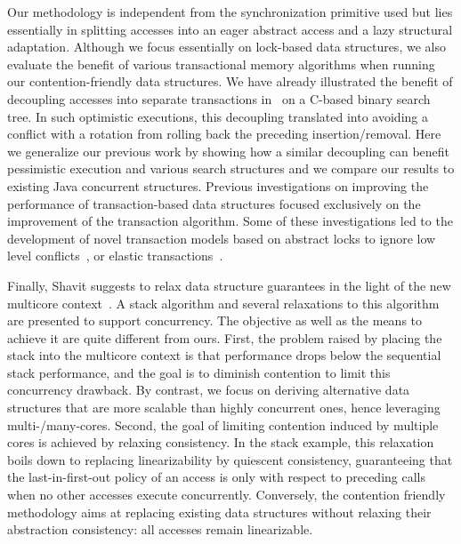 Our methodology is independent from the synchronization primitive used but lies essentially in splitting 
accesses into an eager abstract access and a lazy structural adaptation.
Although we focus essentially on lock-based data structures, we also evaluate the benefit of various
transactional memory algorithms when running our contention-friendly data structures.
We have already illustrated the benefit of decoupling accesses into separate transactions 
in~\cite{CGR12} on a C-based 
binary search tree.  In such optimistic executions, this decoupling translated into avoiding a conflict with a 
rotation from rolling back the preceding insertion/removal.
Here we generalize our previous work by showing how a similar decoupling can benefit 
pessimistic execution and various search structures and we compare our results to existing Java concurrent structures.
Previous investigations on improving the performance of transaction-based data structures focused 
exclusively on the improvement of the transaction algorithm. Some of these investigations led to the 
development of novel transaction models based on abstract locks to ignore low level conflicts~\cite{NMA+07,HK08}, 
or elastic transactions~\cite{FGG09}.

Finally, Shavit suggests to relax data structure guarantees in the light of the new multicore context~\cite{Sha11}. A stack algorithm and several relaxations to this algorithm
are presented to support concurrency. The objective as well as the means to achieve it are quite different from ours. 
First, the problem raised by placing the stack into the multicore context is that performance drops below the sequential stack performance, and 
the goal is to diminish contention to limit this concurrency drawback. By contrast, we focus on deriving alternative data structures that are more scalable than highly concurrent ones, hence leveraging multi-/many-cores.
Second, the goal of limiting contention induced by multiple cores is achieved by relaxing consistency. In the stack example, this relaxation boils down 
to replacing linearizability by quiescent consistency, guaranteeing that the last-in-first-out policy of an access is only with respect to preceding calls 
when no other accesses execute concurrently.
Conversely, the contention friendly methodology aims at replacing existing data structures without relaxing their abstraction consistency: all accesses remain linearizable.

